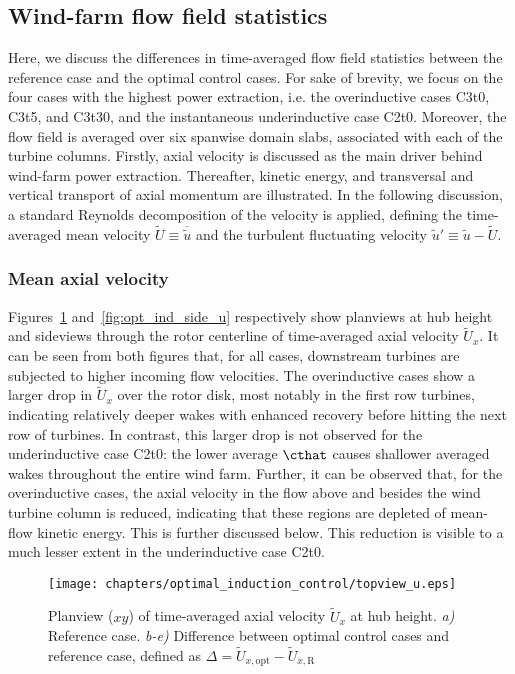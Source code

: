 \subsection{Wind-farm flow field statistics}\label{sec:opt_ind_flow}

	Here, we discuss the differences in time-averaged flow field statistics between the reference case and the optimal control cases. For sake of brevity, we focus on the four cases with the highest power extraction, i.e. the overinductive cases C3t0, C3t5, and C3t30, and the instantaneous underinductive case C2t0. Moreover, the flow field is averaged over six spanwise domain slabs, associated with each of the turbine columns. Firstly, axial velocity is discussed as the main driver behind wind-farm power extraction. Thereafter, kinetic energy, and transversal and vertical transport of axial momentum are illustrated. In the following discussion, a standard Reynolds decomposition of the velocity is applied, defining the time-averaged mean velocity $\widetilde{U} \equiv \overline{\widetilde{u}}$ and the turbulent fluctuating velocity $\widetilde{u}' \equiv  \widetilde{u} - \widetilde{U}$.

	\subsubsection{Mean axial velocity}

	Figures~\ref{fig:opt_ind_top_u} and~\ref{fig:opt_ind_side_u} respectively show planviews at hub height and sideviews through the rotor
	centerline of time-averaged axial velocity ${\widetilde{U}}_x$. It can be seen from both figures that, for all cases, downstream
	turbines are subjected to higher incoming flow velocities. The overinductive cases show a larger drop in $\widetilde{U}_x$ over the
	rotor disk, most notably in the first row turbines, indicating relatively deeper wakes with enhanced recovery before hitting the next row of
	turbines. In contrast, this larger drop is not observed for the underinductive case C2t0: the lower average $\cthat$ causes shallower averaged
	wakes throughout the entire wind farm. Further, it can be observed that, for the overinductive cases, the axial velocity in the flow above and
	besides the wind turbine column is reduced, indicating that these regions are depleted of mean-flow kinetic energy. This is further discussed
	below. This reduction is visible to a much lesser extent in the underinductive case C2t0.
	
	\begin{figure}[ht]
		\centering
		\texttt{[image: chapters/optimal\_induction\_control/topview\_u.eps]}
		\caption[Planview ($xy$) of time-averaged axial velocity $\widetilde{U}_x$ at hub height.]{Planview ($xy$) of time-averaged axial velocity $\widetilde{U}_x$ at hub height. \emph{a) } Reference case. \emph{b-e)} Difference between optimal control cases and reference case, defined as $\Delta = \widetilde{U}_{x,\text{opt}} - \widetilde{U}_{x,\text{R}}$  \label{fig:opt_ind_top_u}}
	\end{figure}

